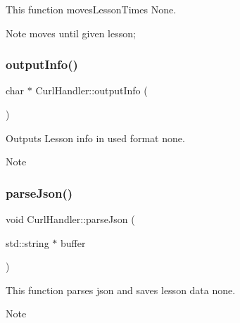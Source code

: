 This function moves\+Lesson\+Times  None. 

\begin{DoxyNote}{Note}
moves until given lesson; 
\end{DoxyNote}
\mbox{\label{classCurlHandler_a5d840e40c7e2d11297514947e957d542}} 
\subsubsection{\texorpdfstring{output\+Info()}{outputInfo()}}
{\footnotesize\ttfamily char $\ast$ Curl\+Handler\+::output\+Info (\begin{DoxyParamCaption}{ }\end{DoxyParamCaption})}



Outputs Lesson info in used format  none. 

\begin{DoxyNote}{Note}

\end{DoxyNote}
\mbox{\label{classCurlHandler_a2e63afaaf3fd64263505f90821f02d05}} 
\subsubsection{\texorpdfstring{parse\+Json()}{parseJson()}}
{\footnotesize\ttfamily void Curl\+Handler\+::parse\+Json (\begin{DoxyParamCaption}\item[{std\+::string $\ast$}]{buffer }\end{DoxyParamCaption})}



This function parses json and saves lesson data  none. 

\begin{DoxyNote}{Note}

\end{DoxyNote}
\mbox{\label{classCurlHandler_aff816fc825c4ad52b377c808a900d07d}} 
